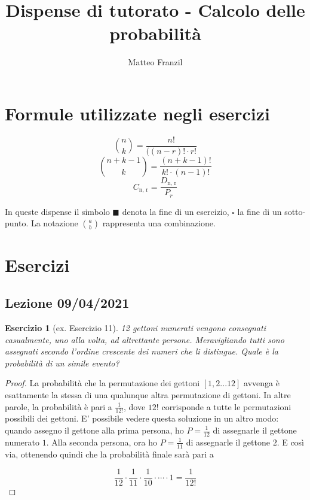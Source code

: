 \documentclass[12pt]{article}
\newtheorem{theorem}{Esercizio}
\begin{document}
\title{Dispense di tutorato - Calcolo delle probabilità}
\author{Matteo Franzil}
\maketitle

\tableofcontents

\newpage
\section{Formule utilizzate negli esercizi}

$$
{n \choose k} = \frac{n!}{((n-r)! \cdot r!}
$$
$$
{n + k - 1 \choose k} = \frac{(n + k - 1)!}{k! \cdot (n - 1)!}
$$
$$
C_{\text{n, r}} = \frac{D_{\text{n, r}}}{P_r}
$$

In queste dispense il simbolo $\blacksquare$ denota la fine di un esercizio, $\square$ la fine di un sotto-punto. La notazione ${a \choose b}$ rappresenta una combinazione.

\section{Esercizi}
\subsection{Lezione 09/04/2021}

\begin{theorem}[ex. Esercizio 11]
12 gettoni numerati vengono consegnati casualmente, uno alla volta, ad altrettante persone. Meravigliando tutti sono assegnati secondo l'ordine crescente dei numeri che li distingue. Quale è la probabilità di un simile evento?
\end{theorem}

\begin{proof}
La probabilità che la permutazione dei gettoni $[1, 2...12]$ avvenga è esattamente la stessa di una qualunque altra permutazione di gettoni. In altre parole, la probabilità è pari a $\frac{1}{12!}$, dove $12!$ corrisponde a tutte le permutazioni possibili dei gettoni. E' possibile vedere questa soluzione in un altro modo: quando assegno il gettone alla prima persona, ho $P = \frac{1}{12}$ di assegnarle il gettone numerato $1$. Alla seconda persona, ora ho $P =\frac{1}{11}$ di assegnarle il gettone $2$. E così via, ottenendo quindi che la probabilità finale sarà pari a 

$$\frac{1}{12} \cdot \frac{1}{11} \cdot \frac{1}{10} \cdot \cdots \cdot 1 = \frac{1}{12!}
$$

\end{proof}
\end{document}
